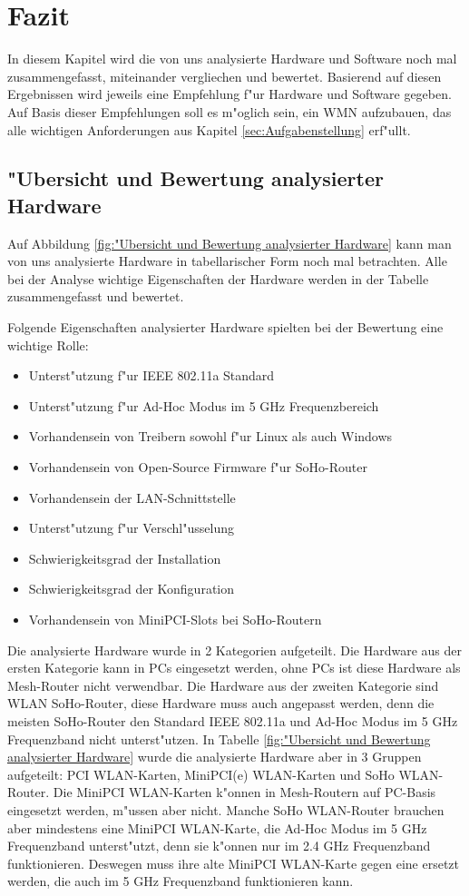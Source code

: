\section{Fazit}

In diesem Kapitel wird die von uns analysierte Hardware und Software noch
mal zusammengefasst, miteinander vergliechen und bewertet. Basierend
auf diesen Ergebnissen wird jeweils eine Empfehlung f"ur Hardware und
Software gegeben. Auf Basis dieser Empfehlungen soll es m"oglich sein,
ein WMN aufzubauen, das alle wichtigen Anforderungen aus Kapitel
\ref{sec:Aufgabenstellung} erf"ullt.

\subsection{"Ubersicht und Bewertung analysierter Hardware}

Auf Abbildung \ref{fig:"Ubersicht und Bewertung analysierter Hardware}
kann man von uns analysierte Hardware in tabellarischer Form noch mal
betrachten. Alle bei der Analyse wichtige Eigenschaften der Hardware
werden in der Tabelle zusammengefasst und bewertet.

Folgende Eigenschaften analysierter Hardware spielten bei der Bewertung
eine wichtige Rolle:

\begin{itemize}
\item Unterst"utzung f"ur IEEE 802.11a Standard
\item Unterst"utzung f"ur Ad-Hoc Modus im 5 GHz Frequenzbereich
\item Vorhandensein von Treibern sowohl f"ur Linux als auch Windows
\item Vorhandensein von Open-Source Firmware f"ur SoHo-Router
\item Vorhandensein der LAN-Schnittstelle
\item Unterst"utzung f"ur Verschl"usselung
\item Schwierigkeitsgrad der Installation
\item Schwierigkeitsgrad der Konfiguration
\item Vorhandensein von MiniPCI-Slots bei SoHo-Routern
\end{itemize}

Die analysierte Hardware wurde in 2 Kategorien aufgeteilt. Die Hardware
aus der ersten Kategorie kann in PCs eingesetzt werden, ohne PCs ist diese
Hardware als Mesh-Router nicht verwendbar. Die Hardware aus der zweiten
Kategorie sind WLAN SoHo-Router, diese Hardware muss auch angepasst werden,
denn die meisten SoHo-Router den Standard IEEE 802.11a und Ad-Hoc Modus
im 5 GHz Frequenzband nicht unterst"utzen. In Tabelle
\ref{fig:"Ubersicht und Bewertung analysierter Hardware} wurde die analysierte
Hardware aber in 3 Gruppen aufgeteilt: PCI WLAN-Karten, MiniPCI(e) WLAN-Karten
und SoHo WLAN-Router. Die MiniPCI WLAN-Karten k"onnen in Mesh-Routern auf
PC-Basis eingesetzt werden, m"ussen aber nicht. Manche SoHo WLAN-Router
brauchen aber mindestens eine MiniPCI WLAN-Karte, die Ad-Hoc Modus
im 5 GHz Frequenzband unterst"utzt, denn sie k"onnen nur im 2.4 GHz
Frequenzband funktionieren. Deswegen muss ihre alte MiniPCI WLAN-Karte gegen
eine ersetzt werden, die auch im 5 GHz Frequenzband funktionieren kann.

